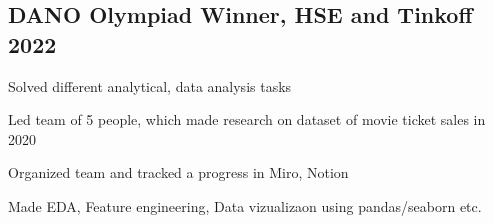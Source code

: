 \documentclass[a4paper,12pt]{article}
\begin{document}

\vspace*{5pt}
\subsection{{DANO Olympiad Winner, HSE and Tinkoff }\hfill 2022}
\begin{zitemize}
\item Solved different analytical, data analysis tasks
\item Led team of 5 people, which made research on dataset of
movie ticket sales in 2020
\item Organized team and tracked a progress in Miro, Notion
\item Made EDA, Feature engineering, Data vizualizaon using
pandas/seaborn etc.
\end{zitemize}

\end{document}
